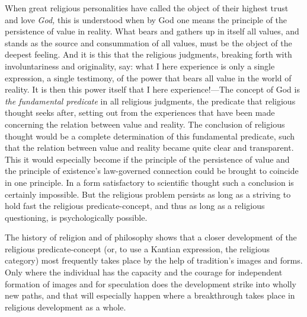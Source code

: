 \documentclass[12pt,a4paper]{book}
\newcommand{\opage}[1]{\marginnote{\footnotesize\textit{[#1]}}}
\begin{document}
When great religious personalities have called the object of their highest trust and love
\emph{God,} this is understood when by God one means the principle of the persistence of
value in reality. What bears and gathers up in itself all values, and stands as the source
and consummation of all values, must be the object of the deepest feeling. And it is this
that the religious judgments, breaking forth with involuntariness and originality, say: what
I here experience is only a single expression, a single testimony, of the power that bears
all value in the world of reality. It is then this power itself that I here experience!---The
concept of God is \emph{the fundamental predicate} in all religious judgments, the predicate
that religious thought seeks after, setting out from the experiences that have been made
concerning the relation between value and reality. The conclusion 
\opage{124}of religious thought would
be a complete determination of this fundamental predicate, such that the relation between
value and reality became quite clear and transparent. This it would especially become if the
principle of the persistence of value and the principle of existence's law-governed connection
could be brought to coincide in one principle. In a form satisfactory to scientific thought
such a conclusion is certainly impossible. But the religious problem persists as long as a
striving to hold fast the religious predicate-concept, and thus as long as a religious
questioning, is psychologically possible.

The history of religion and of philosophy shows that a closer development of the religious
predicate-concept (or, to use a Kantian expression, the religious category) most frequently
takes place by the help of tradition's images and forms. Only where the individual has the
capacity and the courage for independent formation of images and for speculation does the
development strike into wholly new paths, and that will especially happen where a breakthrough
takes place in religious development as a whole.
\end{document}
